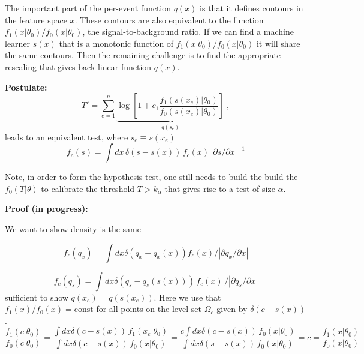 \documentclass[11pt, oneside]{article}   	%
\begin{document}
The important part of the per-event function $q(x)$ is that it defines contours in the feature space $x$. These contours are also equivalent to the function $f_1(x|\theta_0)/f_0(x|\theta_0)$, the signal-to-background ratio. If we can find a machine learner $s(x)$ that is a monotonic function of $f_1(x|\theta_0)/f_0(x|\theta_0)$ it will share the same contours. Then the remaining challenge is to find the appropriate rescaling that gives back  linear function $q(x)$. 

\textbf{Postulate:}
\begin{equation}
T' = \sum_{e=1}^n \underbrace{\log \left[ 1+c_1\frac {f_1(s(x_e) | \theta_0) }{ f_0(s(x_e) | \theta_0) } \right]}_{q(s_e)} \;,
\end{equation}
leads to an equivalent test, where $s_e \equiv s(x_e)$
\begin{equation}
f_c(s) = \int dx \, \delta(s-s(x)) \, f_c(x)  \,  |\partial s / \partial x|^{-1}
\end{equation}



Note, in order to form the hypothesis test, one still needs to build the build the $f_0(T|\theta)$ to calibrate the threshold  $T>k_\alpha$ that gives rise to a test of size $\alpha$. 



\textbf{Proof (in progress):}

We want to show density is the same 

\begin{equation}
f_c(q_x) = \int dx \delta(q_x-q_x(x)) f_c(x) / |\partial q_x / \partial x|
\end{equation}

\begin{equation}
f_c(q_s) = \int dx \delta(q_s-q_s(s(x))) \, f_c(x) \, / |\partial q_s / \partial x|
\end{equation}
sufficient to show $q(x_e) = q(s(x_e))$.  Here we use that $f_1(x)/f_0(x)=\textrm{const}$ for all points on the level-set $\Omega_c$ given by $ \delta(c-s(x))$. 
\begin{equation}
\frac {f_1(c | \theta_0) }{ f_0(c | \theta_0) } = 
\frac { \int dx \delta(c-s(x)) \, f_1(x_e | \theta_0) }{ \int dx \delta(c-s(x)) \, f_0(x | \theta_0)  } = 
\frac {c \int dx \delta(c-s(x)) \, f_0(x | \theta_0)  }{ \int dx \delta(s-s(x)) \, f_0(x | \theta_0)  } = c =\frac {f_1(x | \theta_0) }{ f_0(x | \theta_0) } 
\end{equation}
\end{document}
